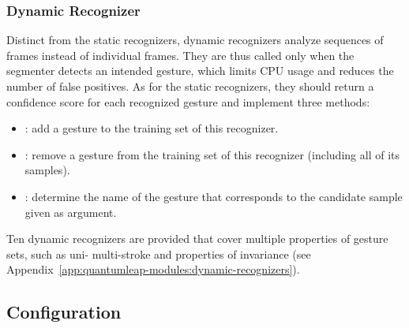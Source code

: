 \subsubsection{Dynamic Recognizer}
Distinct from the static recognizers, dynamic recognizers analyze sequences of frames instead of individual frames. They are thus called only when the segmenter detects an intended gesture, which limits CPU usage and reduces the number of false positives. As for the static recognizers, they should return a confidence score for each recognized gesture and implement three methods:
\begin{itemize}[noitemsep]
    \item {}: add a gesture to the training set of this recognizer. 
    \item {}: remove a gesture from the training set of this recognizer (including all of its samples).
    \item {}: determine the name of the gesture that corresponds to the candidate sample given as argument.
\end{itemize}
Ten dynamic recognizers are provided that cover multiple properties of gesture sets, such as uni- \vs multi-stroke and properties of invariance (see Appendix~\ref{app:quantumleap-modules:dynamic-recognizers}).

\subsection{Configuration} \label{sec:quantumleap:description:configuration}

